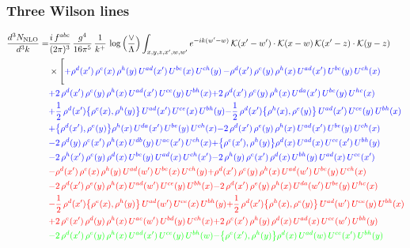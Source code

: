 \documentclass[9pt]{article}
\numberwithin{equation}{section}
\begin{document}
\subsubsection{Three Wilson lines}
\begin{align}
    \frac{d^{3}N_{\rm NLO}}{d^{3}k}= & \frac{i\,f^{abc}}{(2\pi)^{3}}\,\frac{g^{4}}{16\pi^{5}}\,\frac{1}{k^{+}}\,\log\Big(\frac{\vee}{\Lambda}\Big)\int_{x,y,z,x',w,w'}e^{-ik(w'-w)}\,\mathcal{K}(x'-w')\cdot\mathcal{K}(x-w)\,\mathcal{K}(x'-z)\cdot\mathcal{K}(y-z)\notag \\ & \times\Bigg[{\color{blue}+\rho^{d}(x')\,\rho^{e}(x)\,\rho^{h}(y)\,U^{ad}(x')\,U^{be}(x)\,U^{ch}(y)}\,{\color{blue}-\rho^{d}(x')\,\rho^{e}(y)\,\rho^{h}(x)\,U^{ad}(x')\,U^{be}(y)\,U^{ch}(x)}\notag \\ &{\color{blue}+2\,\rho^{d}(x')\,\rho^{e}(y)\,\rho^{h}(x)\,U^{ad}(x')\,U^{ce}(y)\,U^{bh}(x)}{\color{blue}+2\,\rho^{d}(x')\,\rho^{e}(y)\,\rho^{h}(x)\, U^{da}(x')\,U^{be}(y)\,U^{hc}(x)}\notag \\ & {\color{blue}+\frac{1}{2}\,\rho^{d}(x')\big\{\rho^{e}(x),\rho^{h}(y)\big\}\,U^{ad}(x')\,U^{ce}(x)\,U^{bh}(y)}{\color{blue}-\frac{1}{2}\,\rho^{d}(x')\big\{\rho^{h}(x),\rho^{e}(y)\big\}\,U^{ad}(x')\,U^{ce}(y)\,U^{bh}(x)}\notag \\ & {\color{blue}+\big\{\rho^{d}(x'),\rho^{e}(y)\big\}\rho^{h}(x)\,U^{da}(x')\,U^{be}(y)\,U^{ch}(x)}{\color{blue}-2\,\rho^{d}(x')\,\rho^{e}(y)\, \rho^{h}(x)\, U^{ad}(x')\,U^{be}(y)\,U^{ch}(x)}\notag \\ &{\color{blue}-2\,\rho^{d}(y)\,\rho^{e}(x')\, \rho^{h}(x)\, U^{db}(y)\,U^{ae}(x')\,U^{ch}(x)}{\color{blue}+\big\{\rho^{e}(x'),\rho^{h}(y)\big\}\rho^{d}(x)\,U^{ad}(x)\,U^{ce}(x')\,U^{bh}(y)}\notag \\ & {\color{blue}-2\,\rho^{h}(x')\,\rho^{e}(y)\,\rho^{d}(x)\,U^{be}(y)\,U^{ad}(x)\,U^{ch}(x')}{\color{blue}-2\,\rho^{h}(y)\,\rho^{e}(x')\,\rho^{d}(x)\,U^{bh}(y)\,U^{ad}(x)\,U^{ce}(x')}\notag \\ & {\color{red}-\rho^{d}(x')\,\rho^{e}(x)\,\rho^{h}(y)\,U^{ad}(w')\,U^{be}(x)\,U^{ch}(y)}{\color{red}+\rho^{d}(x')\,\rho^{e}(y)\,\rho^{h}(x)\,U^{ad}(w')\,U^{be}(y)\,U^{ch}(x)}\notag \\ &{\color{red}-2\,\rho^{d}(x')\,\rho^{e}(y)\,\rho^{h}(x)\,U^{ad}(w')\,U^{ce}(y)\,U^{bh}(x)} {\color{red}-2\,\rho^{d}(x')\,\rho^{e}(y)\,\rho^{h}(x)\, U^{da}(w')\,U^{be}(y)\,U^{hc}(x)}\notag \\ & {\color{red}-\frac{1}{2}\,\rho^{d}(x')\big\{\rho^{e}(x),\rho^{h}(y)\big\}\,U^{ad}(w')\,U^{ce}(x)\,U^{bh}(y)}{\color{red}+\frac{1}{2}\,\rho^{d}(x')\big\{\rho^{h}(x),\rho^{e}(y)\big\}\,U^{ad}(w')\,U^{ce}(y)\,U^{bh}(x)}\notag \\ & {\color{red}+2\,\rho^{e}(x')\,\rho^{d}(y)\, \rho^{h}(x)\, U^{ae}(w')\,U^{bd}(y)\,U^{ch}(x)}{\color{red}+2\,\rho^{e}(x')\,\rho^{h}(y)\,\rho^{d}(x)\,U^{ad}(x)\,U^{ce}(w')\,U^{bh}(y)}\notag \\ & {\color{green}-2\,\rho^{d}(x')\,\rho^{e}(y)\,\rho^{h}(x)\,U^{ad}(x')\,U^{ce}(y)\,U^{bh}(w)}{\color{green}-\big\{\rho^{e}(x'),\rho^{h}(y)\big\}\rho^{d}(x)\,U^{ad}(w)\,U^{ce}(x')\,U^{bh}(y)}\notag \\ & 
\end{align}
\end{document}
